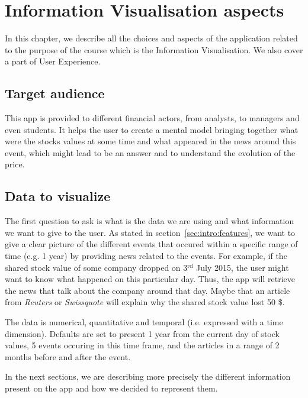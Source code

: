 \chapter{Information Visualisation aspects}
\label{chapter:iv}
In this chapter, we describe all the choices and aspects of the application related to the purpose of the course which is the Information Visualisation. We also cover a part of User Experience.

\section{Target audience}
This app is provided to different financial actors, from analysts, to managers and even students. It helps the user to create a mental model bringing together what were the stocks values at some time and what appeared in the news around this event, which might lead to be an answer and to understand the evolution of the price.

\section{Data to visualize}
The first question to ask is what is the data we are using and what information we want to give to the user. As stated in section~\ref{sec:intro:features}, we want to give a clear picture of the different events that occured within a specific range of time (e.g. 1 year) by providing news related to the events.
For example, if the shared stock value of some company dropped on 3$^{\text{rd}}$ July 2015, the user might want to know what happened on this particular day. Thus, the app will retrieve the news that talk about the company around that day. Maybe that an article from \textit{Reuters} or \textit{Swissquote} will explain why the shared stock value lost 50 \$.

The data is numerical, quantitative and temporal (i.e. expressed with a time dimension). Defaults are set to present 1 year from the current day of stock values, 5 events occuring in this time frame, and the articles in a range of 2 months before and after the event.

In the next sections, we are describing more precisely the different information present on the app and how we decided to represent them.

